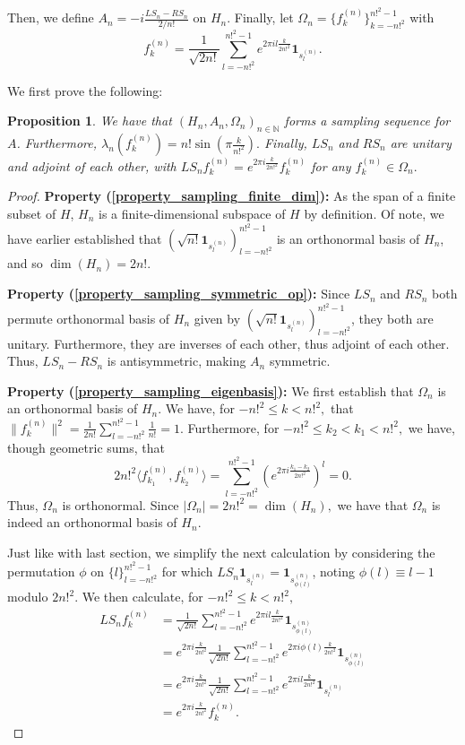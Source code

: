 \documentclass[10pt,a4paper]{amsart}
\newtheorem{prop}[thm]{Proposition}
\def \LL{\langle}
\def \RR{\rangle}
\begin{document}
Then, we define $A_n=-i\frac{LS_n-RS_n}{2/n!}$ on $H_n$. Finally, let $\Omega_n=\{f_k^{(n)}\}_{k=-n!^2}^{n!^2-1}$ with $$f_k^{(n)}=\frac{1}{\sqrt{2n!}}\sum_{l=-n!^2}^{n!^2-1}e^{2\pi i l\frac{k}{2n!^2}}\mathbf{1}_{s_l^{(n)}}.$$

We first prove the following:
\begin{prop}
	We have that $(H_n,A_n,\Omega_n)_{n\in\mathbb{N}}$ forms a sampling sequence for $A$. Furthermore, $\lambda_n(f_k^{(n)})=n!\sin\left(\pi\frac{k}{n!^2}\right).$ Finally, $LS_n$ and $RS_n$ are unitary and adjoint of each other, with $LS_n f_k^{(n)}=e^{2\pi i \frac{k}{2n!^2}}f_k^{(n)}$ for any $f_k^{(n)}\in\Omega_n.$
\end{prop} 
\begin{proof}
		\textbf{Property (\ref{property_sampling_finite_dim}):} As the span of a finite subset of $H$, $H_n$ is a finite-dimensional subspace of $H$ by definition. Of note, we have earlier established that $(\sqrt{n!}\mathbf{1}_{s_{l}^{(n)}})_{l=-n!^2}^{n!^2-1}$ is an orthonormal basis of $H_n$, and so $\dim(H_n)=2n!$.
	
	\textbf{Property (\ref{property_sampling_symmetric_op}):} Since $LS_n$ and $RS_n$ both permute orthonormal basis of $H_n$ given by  $(\sqrt{n!}\mathbf{1}_{s_{l}^{(n)}})_{l=-n!^2}^{n!^2-1}$, they both are unitary. Furthermore, they are inverses of each other, thus adjoint of each other. Thus, $LS_n-RS_n$ is antisymmetric, making $A_n$ symmetric.
	
	\textbf{Property (\ref{property_sampling_eigenbasis}):} We first establish that $\Omega_n$ is an orthonormal basis of $H_n$. We have, for $-n!^2\leq k <n!^2,$ that $\|f_k^{(n)}\|^2=\frac{1}{2n!}\sum_{l=-n!^2}^{n!^2-1}\frac{1}{n!}=1.$ Furthermore, for  $-n!^2\leq k_2<k_1 <n!^2,$ we have, though geometric sums, that $$2n!^2\LL f_{k_1}^{(n)},f_{k_2}^{(n)}\RR=\sum_{l=-n!^2}^{n!^2-1}\left(e^{2\pi i\frac{k_1-k_2}{2n!^2}}\right)^l=0. $$ Thus, $\Omega_n$ is orthonormal. Since $|\Omega_n|=2n!^2=\dim(H_n),$ we have that $\Omega_n$ is indeed an orthonormal basis of $H_n$.
	
	Just like with last section, we simplify the next calculation by considering the permutation  $\phi$ on $\{l\}_{l=-n!^2}^{n!^2-1}$ for which $LS_n \mathbf{1}_{s_l^{(n)}}=\mathbf{1}_{s_{\phi(l)}^{(n)}}$, noting $\phi(l)\equiv l-1$ modulo $2n!^2$. We then calculate, for $-n!^2\leq k <n!^2,$
	\begin{align*}
		LS_n f_k^{(n)}&=\frac{1}{\sqrt{2n!}}\sum_{l=-n!^2}^{n!^2-1}e^{2\pi i l\frac{k}{2n!^2}}\mathbf{1}_{s_{\phi(l)}^{(n)}}\\
		&=e^{2\pi i\frac{k}{2n!^2}}\frac{1}{\sqrt{2n!}}\sum_{l=-n!^2}^{n!^2-1}e^{2\pi i \phi(l)\frac{k}{2n!^2}}\mathbf{1}_{s_{\phi(l)}^{(n)}}\\
		&=e^{2\pi i\frac{k}{2n!^2}}\frac{1}{\sqrt{2n!}}\sum_{l=-n!^2}^{n!^2-1}e^{2\pi i l\frac{k}{2n!^2}}\mathbf{1}_{s_l^{(n)}}\\
		&=e^{2\pi i\frac{k}{2n!^2}} f_k^{(n)}.
	\end{align*}
	

\end{proof}
\end{document}
